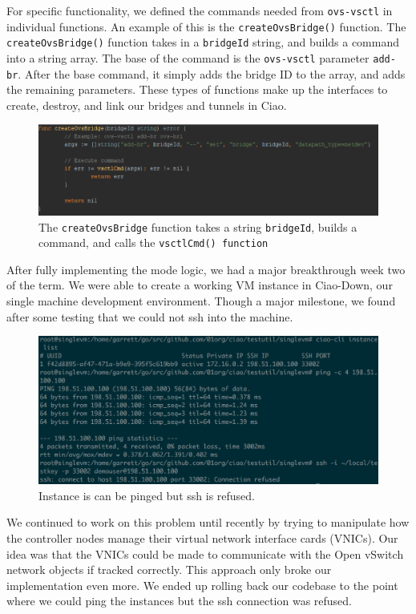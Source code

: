 \documentclass[10pt,onecolumn,journal,draftclsnofoot]{IEEEtran}
\begin{document}
For specific functionality, we defined the commands needed from \texttt{ovs-vsctl}
in individual functions. An example of this is the \texttt{createOvsBridge()} function.
The \texttt{createOvsBridge()} function takes in a \texttt{bridgeId} string, 
and builds a command into a string array. The base of the command is the
\texttt{ovs-vsctl} parameter \texttt{add-br}. After the base command, it simply
adds the bridge ID to the array, and adds the remaining parameters. These types
of functions make up the interfaces to create, destroy, and link our bridges and
tunnels in Ciao.

\begin{figure}[H]
	\caption{The \texttt{createOvsBridge} function takes a string
		\texttt{bridgeId}, builds a command, and calls the \texttt{vsctlCmd()
	function}}
\includegraphics[scale=0.75]{./createOvsBridge.eps}
\end{figure}

After fully implementing the mode logic, we had a major breakthrough week two
of the term. We were able to create a working VM instance in Ciao-Down,
our single machine development environment. Though a major milestone, we found
after some testing that we could not ssh into the machine.

\begin{figure}[H]
\caption{Instance is can be pinged but ssh is refused.}
\includegraphics[scale=0.5]{./ssh-refused.eps}
\end{figure}

We continued to work on this problem until recently by trying to manipulate how
the controller nodes manage their virtual network interface cards (VNICs). Our
idea was that the VNICs could be made to communicate with the Open vSwitch
network objects if tracked correctly. This approach only broke our
implementation even more. We ended up rolling back our codebase to the point
where we could ping the instances but the ssh connection was refused.
\end{document}
